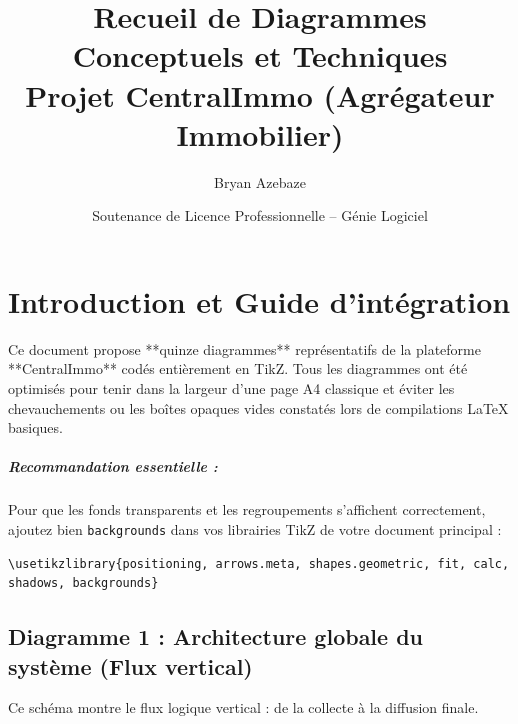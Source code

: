 \documentclass[11pt,a4paper]{report}
\begin{document}
\title{\bfseries Recueil de Diagrammes Conceptuels et Techniques \\ \large Projet CentralImmo (Agrégateur Immobilier)}
\author{Bryan Azebaze}
\date{Soutenance de Licence Professionnelle -- Génie Logiciel}
\maketitle

\thispagestyle{empty}
\newpage

\chapter*{Introduction et Guide d'intégration}
Ce document propose **quinze diagrammes** représentatifs de la plateforme **CentralImmo** codés entièrement en TikZ. 
Tous les diagrammes ont été optimisés pour tenir dans la largeur d'une page A4 classique et éviter les chevauchements ou les boîtes opaques vides constatés lors de compilations LaTeX basiques.

\paragraph{Recommandation essentielle :} 
Pour que les fonds transparents et les regroupements s'affichent correctement, ajoutez bien \texttt{backgrounds} dans vos librairies TikZ de votre document principal :
\begin{verbatim}
\usetikzlibrary{positioning, arrows.meta, shapes.geometric, fit, calc, shadows, backgrounds}
\end{verbatim}

\newpage

\section*{Diagramme 1 : Architecture globale du système (Flux vertical)}
\label{diag:architecture}
Ce schéma montre le flux logique vertical : de la collecte à la diffusion finale.
\end{document}
